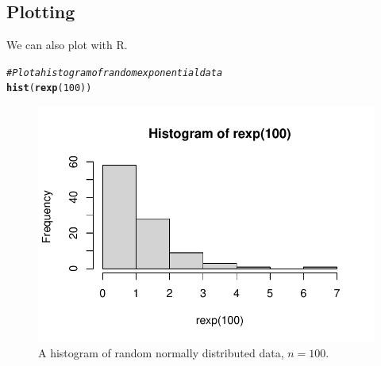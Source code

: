 \documentclass{article}\usepackage[]{graphicx}\usepackage[]{xcolor}
\makeatletter
\def\maxwidth{ %
  \ifdim\Gin@nat@width>\linewidth
    \linewidth
  \else
    \Gin@nat@width
  \fi
}
\newcommand{\hlnum}[1]{\textcolor[rgb]{0.686,0.059,0.569}{#1}}%
\newcommand{\hlcom}[1]{\textcolor[rgb]{0.678,0.584,0.686}{\textit{#1}}}%
\newcommand{\hldef}[1]{\textcolor[rgb]{0.345,0.345,0.345}{#1}}%
\newcommand{\hlkwd}[1]{\textcolor[rgb]{0.737,0.353,0.396}{\textbf{#1}}}%
\newenvironment{kframe}{%
 \def\at@end@of@kframe{}%
 \ifinner\ifhmode%
  \def\at@end@of@kframe{\end{minipage}}%
  \begin{minipage}{\columnwidth}%
 \fi\fi%
 \def\FrameCommand##1{\hskip\@totalleftmargin \hskip-\fboxsep
 \colorbox{shadecolor}{##1}\hskip-\fboxsep
     \hskip-\linewidth \hskip-\@totalleftmargin \hskip\columnwidth}%
 \MakeFramed {\advance\hsize-\width
   \@totalleftmargin\z@ \linewidth\hsize
   \@setminipage}}%
 {\par\unskip\endMakeFramed%
 \at@end@of@kframe}
\newenvironment{knitrout}{}{} %
\makeatother
\begin{document}
\begin{multicols}{2}
\subsection{Plotting}
We can also plot with R.
\begin{knitrout}\scriptsize
{}\color{fgcolor}\begin{kframe}
\begin{alltt}
\hlcom{#Plot a histogram of random exponential data}
\hlkwd{hist}\hldef{(}\hlkwd{rexp}\hldef{(}\hlnum{100}\hldef{))}
\end{alltt}
\end{kframe}
\end{knitrout}
\begin{figure}[H]
\begin{center}
\begin{knitrout}
\color{fgcolor}
\includegraphics[width=\maxwidth]{figure/unnamed-chunk-5-1} 
\end{knitrout}
\caption{A histogram of random normally distributed data, $n=100$.}
\label{plot1} %
\end{center}
\end{figure}

\end{multicols}
\end{document}
